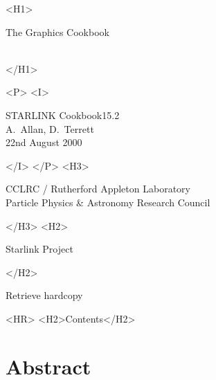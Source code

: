 \documentclass[twoside,11pt]{article}
\newcommand{\stardoccategory}  {STARLINK Cookbook}
\newcommand{\stardocsource}    {sc\stardocnumber}
\newcommand{\stardocnumber}    {15.2}
\newcommand{\stardocauthors}   {A.~Allan, D.~Terrett}
\newcommand{\stardocdate}      {22nd August 2000}
\newcommand{\stardoctitle}     {The Graphics Cookbook}
\newcommand{\htmladdnormallink}[2]{#1}
\newcommand{\htmladdimg}[1]{}
\newcommand{\htmlref}[2]{#1}
\newcommand{\htmladdtonavigation}[1]{}
\newcommand{\xlabel}[1]{}
\newcommand{\latexonlytoc}[0]{\tableofcontents}
\begin{document}
\begin{htmlonly}
   \xlabel{}
   \begin{rawhtml} <H1> \end{rawhtml}
      \stardoctitle\\
      \stardocversion\\
      \stardocmanual
   \begin{rawhtml} </H1> \end{rawhtml}

   \htmladdimg{sc15_cover2.gif}


   \begin{rawhtml} <P> <I> \end{rawhtml}
   \stardoccategory \stardocnumber \\
   \stardocauthors \\
   \stardocdate
   \begin{rawhtml} </I> </P> <H3> \end{rawhtml}
      \htmladdnormallink{CCLRC}{http://www.cclrc.ac.uk} /
      \htmladdnormallink{Rutherford Appleton Laboratory}
                        {http://www.cclrc.ac.uk/ral} \\
      \htmladdnormallink{Particle Physics \& Astronomy Research Council}
                        {http://www.pparc.ac.uk} \\
   \begin{rawhtml} </H3> <H2> \end{rawhtml}
      \htmladdnormallink{Starlink Project}{http://star-www.rl.ac.uk/}
   \begin{rawhtml} </H2> \end{rawhtml}
   \htmladdnormallink{\htmladdimg{source.gif} Retrieve hardcopy}
      {http://star-www.rl.ac.uk/cgi-bin/hcserver?\stardocsource}\\

  \label{stardoccontents}
  \begin{rawhtml} 
    <HR>
    <H2>Contents</H2>
  \end{rawhtml}
  \renewcommand{\latexonlytoc}[0]{}

  \section{\xlabel{abstract}Abstract}
\end{htmlonly}
\end{document}
